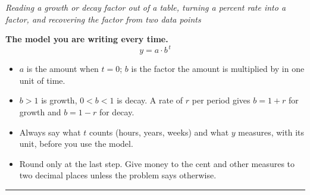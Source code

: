 \documentclass[12pt]{article}
\begin{document}

\begin{center}\small\textit{Reading a growth or decay factor out of a table,
turning a percent rate into a factor, and recovering the factor from two data
points}\end{center}

\noindent\textbf{The model you are writing every time.}
\[ y = a\cdot b^{\,t} \]
\begin{itemize}[leftmargin=0.9cm, itemsep=1pt, topsep=2pt]
  \item $a$ is the amount when $t = 0$; $b$ is the factor the amount is
        multiplied by in one unit of time.
  \item $b > 1$ is growth, $0 < b < 1$ is decay. A rate of $r$ per period gives
        $b = 1 + r$ for growth and $b = 1 - r$ for decay.
  \item Always say what $t$ counts (hours, years, weeks) and what $y$ measures,
        with its unit, before you use the model.
  \item Round only at the last step. Give money to the cent and other measures
        to two decimal places unless the problem says otherwise.
\end{itemize}
\noindent\rule{\linewidth}{0.4pt}

\end{document}
